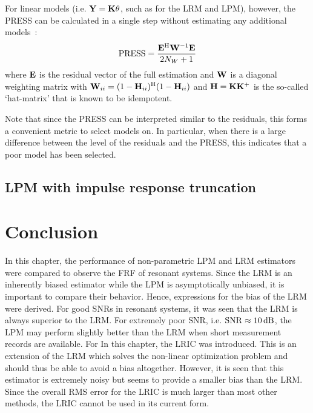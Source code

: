 For linear models (i.e. $\mathbf{Y} = \mathbf{K} \mathbf{\theta}$, such as for the \gls{LRM} and \gls{LPM}), however, the \gls{PRESS} can be calculated in a single step without estimating any additional models~\citep[Sec.~12.3.2]{Seber2003}:
\begin{equation}
\mathrm{PRESS} = \frac{\mathbf{E}^{\mathrm{H}} \mathbf{W}^{-1} \mathbf{E}}{2N_W + 1}
\end{equation}
where $\mathbf{E}$ is the residual vector of the full estimation and $\mathbf{W}$ is a diagonal weighting matrix with $\mathbf{W}_{ii} = (1 - \mathbf{H}_{ii})^{\mathrm{H}} (1 - \mathbf{H}_{ii})$ and
$\mathbf{H} = \mathbf{K} \mathbf{K}^{+}$ is the so-called `hat-matrix' that is known to be idempotent.

Note that since the \gls{PRESS} can be interpreted similar to the residuals, this forms a convenient metric to select models on.
In particular, when there is a large difference between the level of the residuals and the \gls{PRESS}, this indicates that a poor model has been selected.


\subsection{LPM with impulse response truncation}


\section{Conclusion}
\label{sec:conclusion}
In this chapter, the performance of non-parametric \gls{LPM} and \gls{LRM} estimators were compared to observe the \gls{FRF} of resonant systems.
Since the \gls{LRM} is an inherently biased estimator while the \gls{LPM} is asymptotically unbiased, it is important to compare their behavior.
Hence, expressions for the bias of the \gls{LRM} were derived.
For good \glspl{SNR} in resonant systems, it was seen that the \gls{LRM} is always superior to the \gls{LRM}.
For extremely poor \gls{SNR}, i.e. $\mathrm{SNR} \approx 10\,\mathrm{dB}$, the \gls{LPM} may perform slightly better than the \gls{LRM} when short measurement records are available.
For
In this chapter, the \gls{LRIC} was introduced.
This is an extension of the \gls{LRM} which solves the non-linear optimization problem and should thus be able to avoid a bias altogether.
However, it is seen that this estimator is extremely noisy but seems to provide a smaller bias than the \gls{LRM}.
Since the overall \gls{RMS} error for the \gls{LRIC} is much larger than most other methods, the \gls{LRIC} cannot be used in its current form.

